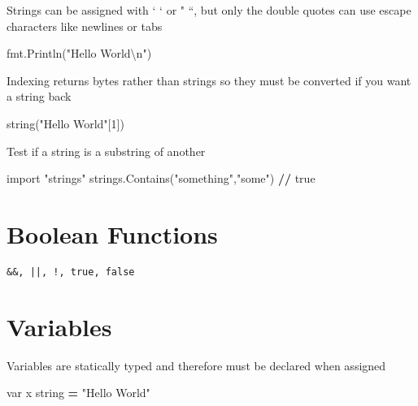 \documentclass[]{book}
\newenvironment{Shaded}{\begin{snugshade}}{\end{snugshade}}
\newcommand{\DecValTok}[1]{\textcolor[rgb]{0.00,0.00,0.81}{#1}}
\newcommand{\CharTok}[1]{\textcolor[rgb]{0.31,0.60,0.02}{#1}}
\newcommand{\StringTok}[1]{\textcolor[rgb]{0.31,0.60,0.02}{#1}}
\newcommand{\ImportTok}[1]{#1}
\newcommand{\OperatorTok}[1]{\textcolor[rgb]{0.81,0.36,0.00}{\textbf{#1}}}
\newcommand{\NormalTok}[1]{#1}
\begin{document}
Strings can be assigned with ` ` or " ``, but only the double quotes can
use escape characters like newlines or tabs

\begin{Shaded}
\begin{Highlighting}[]
\NormalTok{fmt.Println(}\StringTok{"Hello World}\CharTok{\textbackslash{}n}\StringTok{"}\NormalTok{)}
\end{Highlighting}
\end{Shaded}

Indexing returns bytes rather than strings so they must be converted if
you want a string back

\begin{Shaded}
\begin{Highlighting}[]
\NormalTok{string(}\StringTok{"Hello World"}\NormalTok{[}\DecValTok{1}\NormalTok{])}
\end{Highlighting}
\end{Shaded}

Test if a string is a substring of another

\begin{Shaded}
\begin{Highlighting}[]
\ImportTok{import} \StringTok{"strings"}
\NormalTok{strings.Contains(}\StringTok{"something"}\NormalTok{,}\StringTok{"some"}\NormalTok{) }\OperatorTok{//}\NormalTok{ true}
\end{Highlighting}
\end{Shaded}

\section{Boolean Functions}\label{boolean-functions}

\begin{verbatim}
&&, ||, !, true, false
\end{verbatim}

\section{Variables}\label{variables}

Variables are statically typed and therefore must be declared when
assigned

\begin{Shaded}
\begin{Highlighting}[]
\NormalTok{var x string }\OperatorTok{=} \StringTok{"Hello World"}
\end{Highlighting}
\end{Shaded}
\end{document}
